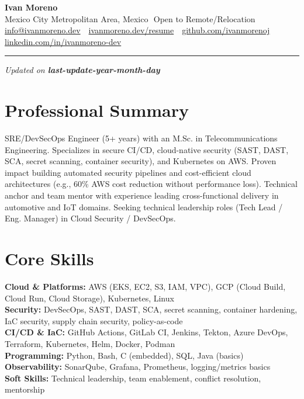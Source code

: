 \documentclass[11pt,a4paper]{article}
\newcommand{\sep}{\,\textbar\,}
\newcommand{\skillcat}[2]{\textbf{#1:} #2\\}
\begin{document}
{\LARGE \textbf{Ivan Moreno}}\\[2pt]
\small Mexico City Metropolitan Area, Mexico \sep Open to Remote/Relocation\\
\small \href{mailto:info@ivanmoreno.dev}{info@ivanmoreno.dev} \sep 
\href{https://ivanmoreno.dev/resume}{ivanmoreno.dev/resume} \sep 
\href{https://github.com/ivanmorenoj}{github.com/ivanmorenoj} \sep 
\href{https://www.linkedin.com/in/ivanmoreno-dev}{linkedin.com/in/ivanmoreno-dev}

\vspace{6pt}
\hrule
\vspace{6pt}

\vspace{-18pt} \null \hfill {\tiny \textit{Updated on \textbf{last-update-year-month-day}}}

\section*{Professional Summary}
SRE/DevSecOps Engineer (5+ years) with an M.Sc. in Telecommunications Engineering. Specializes in secure CI/CD, cloud-native security (SAST, DAST, SCA, secret scanning, container security), and Kubernetes on AWS. Proven impact building automated security pipelines and cost-efficient cloud architectures (e.g., 60\% AWS cost reduction without performance loss). Technical anchor and team mentor with experience leading cross-functional delivery in automotive and IoT domains. Seeking technical leadership roles (Tech Lead / Eng. Manager) in Cloud Security / DevSecOps.

\section*{Core Skills}
\skillcat{Cloud \& Platforms}{AWS (EKS, EC2, S3, IAM, VPC), GCP (Cloud Build, Cloud Run, Cloud Storage), Kubernetes, Linux}
\skillcat{Security}{DevSecOps, SAST, DAST, SCA, secret scanning, container hardening, IaC security, supply chain security, policy-as-code}
\skillcat{CI/CD \& IaC}{GitHub Actions, GitLab CI, Jenkins, Tekton, Azure DevOps, Terraform, Kubernetes, Helm, Docker, Podman}
\skillcat{Programming}{Python, Bash, C (embedded), SQL, Java (basics)}
\skillcat{Observability}{SonarQube, Grafana, Prometheus, logging/metrics basics}
\skillcat{Soft Skills}{Technical leadership, team enablement, conflict resolution, mentorship}
\end{document}
